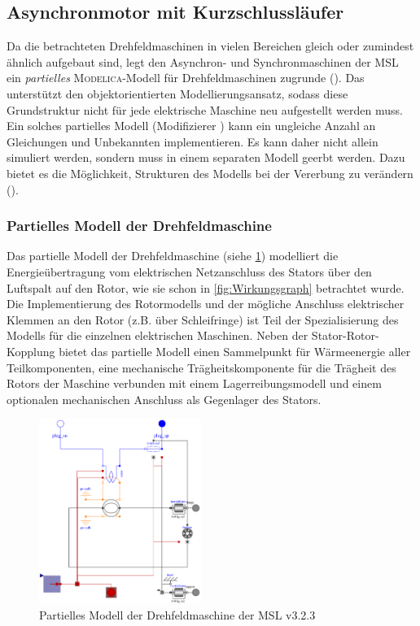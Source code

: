 \subsection{Asynchronmotor mit Kurzschlussläufer}\label{sec:asynchronmotor-mit-kurzschlussluxe4ufer}
Da die betrachteten Drehfeldmaschinen in vielen Bereichen gleich oder zumindest ähnlich aufgebaut sind, legt \cite{kralModelicaObjektorientierteModellbildung2019} den Asynchron- und Synchronmaschinen der MSL ein \emph{partielles} \textsc{Modelica}-Modell für Drehfeldmaschinen zugrunde (). Das unterstützt den objektorientierten Modellierungsansatz, sodass diese Grundstruktur nicht für jede elektrische Maschine neu aufgestellt werden muss. Ein solches partielles Modell (Modifizierer ) kann ein ungleiche Anzahl an Gleichungen und Unbekannten implementieren. Es kann daher nicht allein simuliert werden, sondern muss in einem separaten Modell geerbt werden. Dazu bietet es die Möglichkeit, Strukturen des Modells bei der Vererbung zu verändern ().

\subsubsection{Partielles Modell der Drehfeldmaschine}\label{sec:partielles-modell-der-drehfeldmaschine}
Das partielle Modell der Drehfeldmaschine (siehe \cref{fig:partiellDrehfeldmaschinen}) modelliert die Energieübertragung vom elektrischen Netzanschluss des Stators über den Luftspalt auf den Rotor, wie sie schon in \cref{fig:Wirkungsgraph} betrachtet wurde. Die Implementierung des Rotormodells und der mögliche Anschluss elektrischer Klemmen an den Rotor (z.B. über Schleifringe) ist Teil der Spezialisierung des Modells für die einzelnen elektrischen Maschinen. Neben der Stator-Rotor-Kopplung bietet das partielle Modell einen Sammelpunkt für Wärmeenergie aller Teilkomponenten, eine mechanische Trägheitskomponente für die Trägheit des Rotors der Maschine verbunden mit einem Lagerreibungsmodell und einem optionalen mechanischen Anschluss als Gegenlager des Stators.

\begin{figure}
\centering
\includegraphics[height=6cm]{Bilder/PartialBasicInductionMachine.pdf}
\caption{Partielles Modell der Drehfeldmaschine  der MSL v3.2.3}
\label{fig:partiellDrehfeldmaschinen}
\end{figure}

